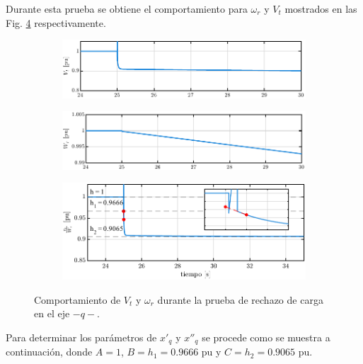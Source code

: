 \documentclass[conference]{IEEEtran}
\begin{document}
Durante esta prueba se obtiene el comportamiento para $\omega_r$ y $V_t$ mostrados en las Fig. \ref{fig:subfigs} respectivamente.

\begin{figure}[ht]
    \centering
    \begin{subfigure}
        \centering
        \includegraphics[width=\linewidth]{Fig/fig3.pdf}
        \label{fig:fig3}
    \end{subfigure}
    \hfill
    \begin{subfigure}
        \centering
        \includegraphics[width=\linewidth]{Fig/fig4.pdf}
        \label{fig:fig4}
    \end{subfigure}
    \hfill
    \begin{subfigure}
        \centering
        \includegraphics[width=\linewidth]{Fig/fig5.pdf}
        \label{fig:fig5}
    \end{subfigure}
    \caption{Comportamiento de $V_t$ y $\omega_r$ durante la prueba de rechazo de carga en el eje $-q-$.}
    \label{fig:subfigs}
\end{figure}

Para determinar los parámetros de $x'_q$ y $x''_q$ se procede como se muestra a continuación, donde
$A=1$, $B=h_1=0.9666\text{ pu}$ y $C=h_2=0.9065\text{ pu}$.
\end{document}
